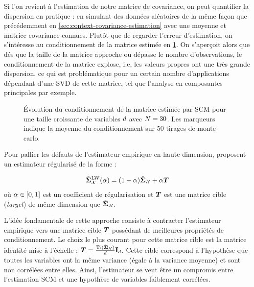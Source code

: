 Si l'on revient à l'estimation de notre matrice de covariance, on peut quantifier la dispersion en pratique : en simulant des données aléatoires de la même façon que précédemment en \cref{sec:context-covariance-estimation} avec une moyenne et matrice covariance connues. Plutôt que de regarder l'erreur d'estimation, on s'intéresse au conditionnement de la matrice estimée en \cref{fig:context-estimation-cond}. On s'aperçoit alors que dés que la taille de la matrice approche ou dépasse le nombre d'observations, le conditionnement de la matrice explose, i.e, les valeurs propres ont une très grande dispersion, ce qui est problématique pour un certain nombre d'applications dépendant d'une SVD de cette matrice, tel que l'analyse en composantes principales par exemple. \\

\begin{figure}[h]
  \begin{center}
        
      \end{center}
  \provScmcondQR[.5cm]
  \caption{\'Evolution du conditionnement de la matrice estimée  par SCM pour une taille croissante de variables $d$ avec $N=30$. Les marqueurs indique la moyenne du conditionnement sur 50 tirages de monte-carlo. \provScmcond}
  \label{fig:context-estimation-cond}
\end{figure}



Pour pallier les défauts de l'estimateur empirique en haute dimension,  proposent un estimateur régularisé de la forme :

\begin{definition}
\begin{equation}
  \hat{\boldsymbol{\Sigma}}_{\mathcal{X}}^{\text{LW}}(\alpha) = (1-\alpha) \hat{\boldsymbol{\Sigma}}_{\mathcal{X}} + \alpha \boldsymbol{T}
\label{eq:context-ledoit-wolf}
\end{equation}
où $\alpha \in [0,1]$ est un coefficient de régularisation et $\boldsymbol{T}$ est une matrice cible (\textit{target}) de même dimension que $\hat{\boldsymbol{\Sigma}}_{\mathcal{X}}$.
\end{definition}

L'idée fondamentale de cette approche consiste à contracter l'estimateur empirique vers une matrice cible $\boldsymbol{T}$ possédant de meilleures propriétés de conditionnement. Le choix le plus courant pour cette matrice cible est la matrice identité mise à l'échelle : $\boldsymbol{T} = \frac{\operatorname{\operatorname{Tr}}(\hat{\boldsymbol{\Sigma}}_{\mathcal{X}})}{d} \mathbf{I}_d$. Cette cible correspond à l'hypothèse que toutes les variables ont la même variance (égale à la variance moyenne) et sont non corrélées entre elles. Ainsi, l'estimateur se veut être un compromis entre l'estimation SCM et une hypothèse de variables faiblement corrélées.

